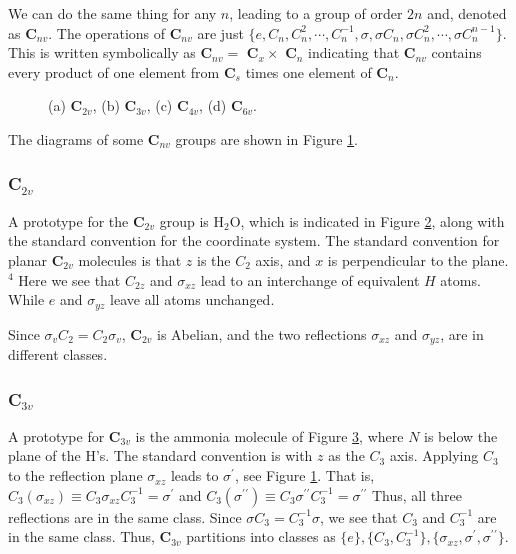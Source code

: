 We can do the same thing for any $n$, leading to a group of order 
$2n$ and, denoted as {\bf C}$_{nv}$.  The operations of {\bf C}$_{nv}$ 
are just $\{e, C_n , C^2_n, \cdots , C^{-1}_n, \sigma , \sigma C_n , 
\sigma C^2_n, \cdots , \sigma C^{n-1}_n\}$.  This is written 
symbolically as {\bf C}$_{nv} =$ {\bf C}$_x \times$ {\bf C}$_n$ 
indicating that {\bf C}$_{nv}$ contains every product of one element 
from {\bf C}$_s$ times one element of {\bf C}$_n$.

\begin{figure}
\caption{(a) {\bf C}$_{2v}$, (b) {\bf C}$_{3v}$, (c) {\bf C}$_{4v}$, 
(d) {\bf C}$_{6v}$.}
\label{chap16-fig14}
\end{figure}

The diagrams of some {\bf C}$_{nv}$ groups are shown in Figure
\ref{chap16-fig14}.

\subsubsection{C$_{2v}$}

\begin{figure}
\caption{}
\label{chap16-fig15}
\end{figure}

A prototype for the {\bf C}$_{2v}$ group is H$_2$O, which is indicated
in Figure \ref{chap16-fig15}, along with the standard convention for
the coordinate system.  The standard convention for planar {\bf
C}$_{2v}$ molecules is that $z$ is the $C_2$ axis, and $x$ is
perpendicular to the plane.$^4$ Here we see that $C_{2z}$ and
$\sigma_{xz}$ lead to an interchange of equivalent $H$ atoms.  While
$e$ and $\sigma_{yz}$ leave all atoms unchanged.

Since $\sigma_vC_2 = C_2 \sigma_v$, {\bf C}$_{2v}$ is Abelian, and 
the two reflections $\sigma_{xz}$ and $\sigma_{yz}$, are in different 
classes.

\subsubsection{C$_{3v}$}

\begin{figure}
\caption{}
\label{chap16-fig16}
\end{figure}

A prototype for {\bf C}$_{3v}$ is the ammonia molecule of Figure
\ref{chap16-fig16}, where $N$ is below the plane of the H's.  The
standard convention is with $z$ as the $C_3$ axis.  Applying $C_3$ to
the reflection plane $\sigma_{xz}$ leads to $\sigma^{\prime}$, see
Figure \ref{chap16-fig14}.  That is, $C_3 \left( \sigma_{xz} \right)
\equiv C_3 \sigma_{xz} C^{-1}_3 = \sigma^{\prime}$ and $C_3 \left(
\sigma^{\prime\prime} \right) \equiv C_3 \sigma^{\prime \prime}
C_3^{-1} = \sigma^{\prime \prime}$ Thus, all three reflections are in
the same class.  Since $\sigma C_3 = C_3^{-1}\sigma$, we see that
$C_3$ and $C_3^{-1}$ are in the same class.  Thus, {\bf C}$_{3v}$
partitions into classes as $\{e\}, \{C_3 , C_3^{-1}\}, \{\sigma_{xz} ,
\sigma^{\prime} , \sigma^{\prime \prime}\}$.


